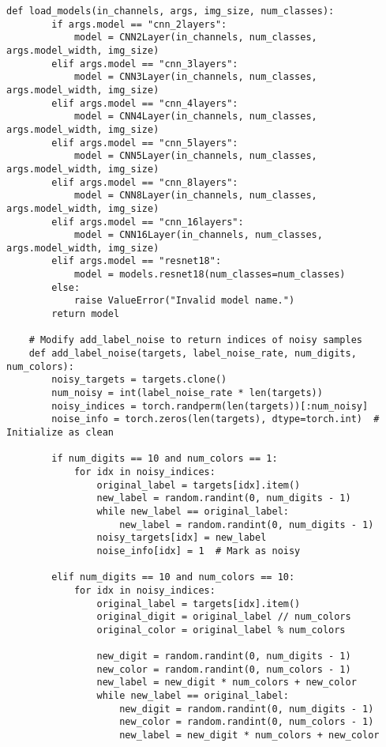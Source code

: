 \begin{lstlisting}[style=pythonstyle, caption={メインコード}]
    def load_models(in_channels, args, img_size, num_classes):
        if args.model == "cnn_2layers":
            model = CNN2Layer(in_channels, num_classes, args.model_width, img_size)
        elif args.model == "cnn_3layers":
            model = CNN3Layer(in_channels, num_classes, args.model_width, img_size)
        elif args.model == "cnn_4layers":
            model = CNN4Layer(in_channels, num_classes, args.model_width, img_size)
        elif args.model == "cnn_5layers":
            model = CNN5Layer(in_channels, num_classes, args.model_width, img_size)
        elif args.model == "cnn_8layers":
            model = CNN8Layer(in_channels, num_classes, args.model_width, img_size)
        elif args.model == "cnn_16layers":
            model = CNN16Layer(in_channels, num_classes, args.model_width, img_size)
        elif args.model == "resnet18":
            model = models.resnet18(num_classes=num_classes)
        else:
            raise ValueError("Invalid model name.")
        return model
    
    # Modify add_label_noise to return indices of noisy samples
    def add_label_noise(targets, label_noise_rate, num_digits, num_colors):
        noisy_targets = targets.clone()
        num_noisy = int(label_noise_rate * len(targets))
        noisy_indices = torch.randperm(len(targets))[:num_noisy]
        noise_info = torch.zeros(len(targets), dtype=torch.int)  # Initialize as clean
    
        if num_digits == 10 and num_colors == 1:
            for idx in noisy_indices:
                original_label = targets[idx].item()
                new_label = random.randint(0, num_digits - 1)
                while new_label == original_label:
                    new_label = random.randint(0, num_digits - 1)
                noisy_targets[idx] = new_label
                noise_info[idx] = 1  # Mark as noisy
    
        elif num_digits == 10 and num_colors == 10:
            for idx in noisy_indices:
                original_label = targets[idx].item()
                original_digit = original_label // num_colors
                original_color = original_label % num_colors
    
                new_digit = random.randint(0, num_digits - 1)
                new_color = random.randint(0, num_colors - 1)
                new_label = new_digit * num_colors + new_color
                while new_label == original_label:
                    new_digit = random.randint(0, num_digits - 1)
                    new_color = random.randint(0, num_colors - 1)
                    new_label = new_digit * num_colors + new_color
    

\end{lstlisting}
